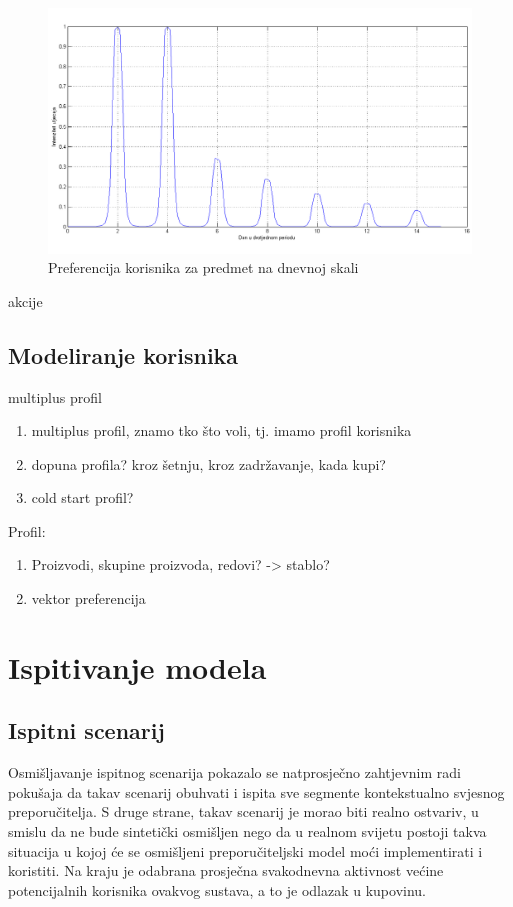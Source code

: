 \documentclass[times, utf8, diplomski, numeric]{fer}
\begin{document}
\begin{figure}[htb]
	\centering
	\includegraphics[width=14.21cm]{images/prigusenocropped.png}
	\caption{Preferencija korisnika za predmet na dnevnoj skali}
	\label{fig:GaussPriguseno}
\end{figure}

akcije

\section{Modeliranje korisnika}
multiplus profil

\begin{enumerate}
  \item multiplus profil, znamo tko što voli, tj. imamo profil korisnika
  \item dopuna profila? kroz šetnju, kroz zadržavanje, kada kupi?
  \item cold start profil?
\end{enumerate}

Profil:
\begin{enumerate}
  \item Proizvodi, skupine proizvoda, redovi? -> stablo?
  \item vektor preferencija
\end{enumerate}

\chapter{Ispitivanje modela}
\section{Ispitni scenarij}
Osmišljavanje ispitnog scenarija pokazalo se natprosječno zahtjevnim radi
pokušaja da takav scenarij obuhvati i ispita sve segmente kontekstualno svjesnog
preporučitelja. S druge strane, takav scenarij je morao biti realno
ostvariv, u smislu da ne bude sintetički osmišljen nego da u realnom
svijetu postoji takva situacija u kojoj će se osmišljeni preporučiteljski
model moći implementirati i koristiti. Na kraju je odabrana prosječna
svakodnevna aktivnost većine potencijalnih korisnika ovakvog sustava, a to je
odlazak u kupovinu.
\end{document}
